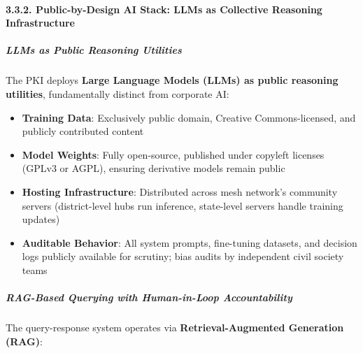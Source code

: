 \paragraph{3.3.2. Public-by-Design AI Stack: LLMs as Collective
Reasoning
Infrastructure}\label{public-by-design-ai-stack-llms-as-collective-reasoning-infrastructure}

\subparagraph{LLMs as Public Reasoning
Utilities}\label{llms-as-public-reasoning-utilities}

The PKI deploys \textbf{Large Language Models (LLMs) as public reasoning
utilities}, fundamentally distinct from corporate AI:

\begin{itemize}
\tightlist
\item
  \textbf{Training Data}: Exclusively public domain, Creative
  Commons-licensed, and publicly contributed content
\item
  \textbf{Model Weights}: Fully open-source, published under copyleft
  licenses (GPLv3 or AGPL), ensuring derivative models remain public
\item
  \textbf{Hosting Infrastructure}: Distributed across mesh network's
  community servers (district-level hubs run inference, state-level
  servers handle training updates)
\item
  \textbf{Auditable Behavior}: All system prompts, fine-tuning datasets,
  and decision logs publicly available for scrutiny; bias audits by
  independent civil society teams
\end{itemize}

\subparagraph{RAG-Based Querying with Human-in-Loop
Accountability}\label{rag-based-querying-with-human-in-loop-accountability}

The query-response system operates via \textbf{Retrieval-Augmented
Generation (RAG)}:

